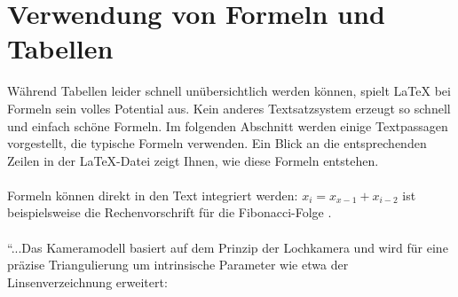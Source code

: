 \section{Verwendung von Formeln und Tabellen}
\label{sec:formeln}
%
Während Tabellen leider schnell unübersichtlich werden können, spielt LaTeX bei Formeln sein volles Potential aus. Kein anderes Textsatzsystem erzeugt so schnell und einfach schöne Formeln. Im folgenden Abschnitt werden einige Textpassagen vorgestellt, die typische Formeln verwenden. Ein Blick an die entsprechenden Zeilen in der LaTeX-Datei zeigt Ihnen, wie diese Formeln entstehen.\\
\\
Formeln können direkt in den Text integriert werden: $x_i=x_{x-1} + x_{i-2}$ ist beispielsweise die Rechenvorschrift für die Fibonacci-Folge \cite{conway96}. \\
\\
``...Das Kameramodell basiert auf dem Prinzip der Lochkamera und wird für eine präzise Triangulierung um intrinsische Parameter wie etwa der Linsenverzeichnung erweitert: \\

